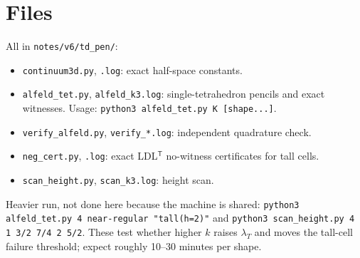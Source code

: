 \documentclass[11pt]{article}
\theoremstyle{remark}\newtheorem{remark}[theorem]{Remark}
\begin{document}
\section{Files}
All in \texttt{notes/v6/td\_pen/}:
\begin{itemize}
\item \texttt{continuum3d.py}, \texttt{.log}: exact half-space constants.
\item \texttt{alfeld\_tet.py}, \texttt{alfeld\_k3.log}: single-tetrahedron pencils and exact witnesses. Usage: \texttt{python3 alfeld\_tet.py K [shape...]}.
\item \texttt{verify\_alfeld.py}, \texttt{verify\_*.log}: independent quadrature check.
\item \texttt{neg\_cert.py}, \texttt{.log}: exact LDL$^{\mathsf T}$ no-witness certificates for tall cells.
\item \texttt{scan\_height.py}, \texttt{scan\_k3.log}: height scan.
\end{itemize}
Heavier run, not done here because the machine is shared: \texttt{python3 alfeld\_tet.py 4 near-regular "tall(h=2)"} and \texttt{python3 scan\_height.py 4 1 3/2 7/4 2 5/2}. These test whether higher $k$ raises $\lambda_T$ and moves the tall-cell failure threshold; expect roughly 10--30 minutes per shape.
\end{document}

